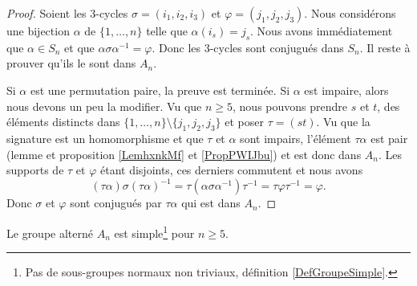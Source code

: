 \begin{proof}
    Soient les \( 3\)-cycles \( \sigma=(i_1,i_2,i_3)\) et \( \varphi=(j_1,j_2,j_3)\). Nous considérons une bijection \( \alpha\) de \( \{ 1,\ldots, n \}\) telle que \( \alpha(i_s)=j_s\). Nous avons immédiatement que \( \alpha\in S_n\) et que \( \alpha\sigma\alpha^{-1}=\varphi\). Donc les \( 3\)-cycles sont conjugués dans \( S_n\). Il reste à prouver qu'ils le sont dans \( A_n\).

    Si \( \alpha\) est une permutation paire, la preuve est terminée. Si \( \alpha\) est impaire, alors nous devons un peu la modifier. Vu que \( n\geq 5\), nous pouvons prendre \( s\) et \( t\), des éléments distincts dans \( \{ 1,\ldots, n \}\setminus\{ j_1,j_2,j_3 \}\) et poser \( \tau=(st)\). Vu que la signature est un homomorphisme et que \( \tau\) et \( \alpha\) sont impairs, l'élément \( \tau\alpha\) est pair (lemme et proposition \ref{LemhxnkMf} et \ref{PropPWIJbu}) et est donc dans \( A_n\). Les supports de \( \tau\) et \( \varphi\) étant disjoints, ces derniers commutent et nous avons
    \begin{equation}
        (\tau\alpha)\sigma(\tau\alpha)^{-1}=\tau(\alpha\sigma\alpha^{-1})\tau^{-1}=\tau\varphi\tau^{-1} = \varphi.
    \end{equation}
    Donc \( \sigma\) et \( \varphi\) sont conjugués par \( \tau\alpha\) qui est dans \( A_n\).
\end{proof}

\begin{theorem} \label{ThoURfSUXP}
    Le groupe alterné \( A_n\) est simple\footnote{Pas de sous-groupes normaux non triviaux, définition \ref{DefGroupeSimple}.} pour \( n\geq 5\).
\end{theorem}


